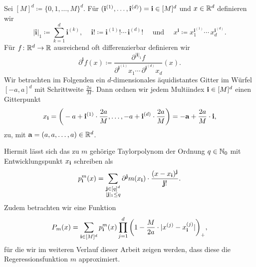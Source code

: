 Sei $[M]^d \coloneqq\{0, 1, \dots, M\}^d.$ 
Für $(\mathbf{i}^{(1)},\dots,\mathbf{i}^{(d)}) = \mathbf{i} \in [M]^d$ und $x \in \mathbb{R}^d$ definieren wir
$$|\mathbf{i}|_1 \coloneqq \sum_{k= 1}^d \mathbf{i}^{(k)} \text{, } \quad \mathbf{i}! \coloneqq \mathbf{i}^{(1)}! \cdots \, \mathbf{i}^{(d)}! \quad \text{ und } \quad x^{\mathbf{i}} \coloneqq x_1^{\mathbf{i}^{(1)}} \cdots \,    x_d^{\mathbf{i}^{(d)}}.$$
Für $f\colon \mathbb{R}^d \to \mathbb{R}$ ausreichend oft differenzierbar definieren wir 
$$\partial^{\mathbf{i}}f(x) \coloneqq \frac{\partial^{|\mathbf{i}|_1}f}{\partial^{\mathbf{i}^{(1)}} x_1 \cdots \, \partial^{\mathbf{i}^{(d)}} x_d} (x).$$
Wir betrachten im Folgenden ein $d$-dimensionales äquidistantes Gitter im Würfel $[-a, a]^d$ mit Schrittweite $\frac{2a}{M}.$ 
Dann ordnen wir jedem Multiindex $\mathbf{i} \in [M]^d$ einen Gitterpunkt
\begin{equation}
\label{eq:gitter}
x_{\mathbf{i}} = \bigg( -a + \mathbf{i}^{(1)} \cdot \frac{2a}{M},\dots, -a + \mathbf{i}^{(d)} \cdot \frac{2a}{M}\bigg) = -\mathbf{a} + \frac{2a}{M} \cdot \mathbf{i},
\end{equation}
zu, mit $\mathbf{a} = (a, a, \dots, a) \in \mathbb{R}^d$.

Hiermit lässt sich das zu $m$ gehörige Taylorpolynom der Ordnung $q \in \mathbb{N}_0$ mit Entwicklungspunkt $x_{\mathbf{i}}$ schreiben als
$$p_{\mathbf{i}}^m(x) = \sum_{\substack{\mathbf{j} \in [q]^d \\|\mathbf{j}|_1 \leq q}} \partial^{\mathbf{j}}m(x_{\mathbf{i}}) \cdot \frac{(x - x_{\mathbf{i}})^{\mathbf{j}}}{\mathbf{j}!}.$$
Zudem betrachten wir eine Funktion
\begin{equation}
\label{konvexkomb}
P_m(x) = \sum_{\mathbf{i} \in [M]^d} p_{\mathbf{i}}^m(x) \prod_{j = 1}^{d} \bigg(1 - \frac{M}{2a} \cdot |x^{(j)} - x_{\mathbf{i}}^{(j)}|\bigg)_+,
\end{equation}
für die wir im weiteren Verlauf dieser Arbeit zeigen werden, dass diese die Regeressionsfunktion $m$ approximiert.

